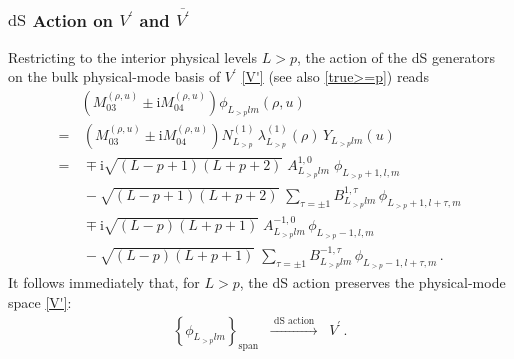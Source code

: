 \documentclass[aps,twocolumn,nofootinbib]{revtex4}
\begin{document}
{\begin{appendix}
\subsubsection{$\mathrm{dS}$ Action on $V^\prime$ and $\overline{V^\prime}$} 

Restricting to the interior physical levels $L>p$, the action of the dS generators on the bulk physical-mode basis of $V^\prime$ \eqref{V'} (see also \eqref{true>=p}) reads
\begin{align}
    &\!\!\!\!\!\!\!\left(M_{03}^{(\rho, u)} \pm \mathrm{i}M_{04}^{(\rho, u)}\right) \phi^{}_{L^{}_{> p}lm}(\rho,u) \nonumber\\[3pt]
    =&\, \left(M_{03}^{(\rho, u)} \pm \mathrm{i} M_{04}^{(\rho, u)}\right) N^{(1)}_{L_{> p}}\, \lambda_{L_{> p}}^{(1)}(\rho)\, Y^{}_{L^{}_{> p}lm}(u) \nonumber\\[3pt]
    =&\, \mp\mathrm{i} \sqrt{(L-p+1)(L+p+2)} \; A^{1,0}_{L^{}_{> p}lm}\;\phi^{}_{L^{}_{> p}+1,l,m} \nonumber\\[3pt]    
    &\, - \sqrt{(L-p+1)(L+p+2)} \; \sum_{\tau=\pm1} B^{1,\tau}_{L^{}_{> p}lm} \, \phi^{}_{L^{}_{> p}+1,l+\tau,m} \nonumber\\[3pt]
    &\, \mp \mathrm{i} \sqrt{(L-p)(L+p+1)} \; A^{-1,0}_{L^{}_{> p}lm}\, \phi^{}_{L^{}_{> p}-1,l,m} \nonumber\\[3pt]
    &\, - \sqrt{(L-p)(L+p+1)} \; \sum_{\tau=\pm1} B^{-1,\tau}_{L^{}_{> p}lm}\, \phi^{}_{L^{}_{> p}-1,l+\tau,m} \,.
\end{align}
It follows immediately that, for $L> p$, the dS action preserves the physical-mode space \eqref{V'}:
\begin{align}
    \left\{\phi^{}_{L^{}_{> p}lm}\right\}_{\mathrm{span}} \;\;\xrightarrow[]{\text{ dS action }}\;\; V^\prime \,.
\end{align}


\end{appendix}}
\end{document}
